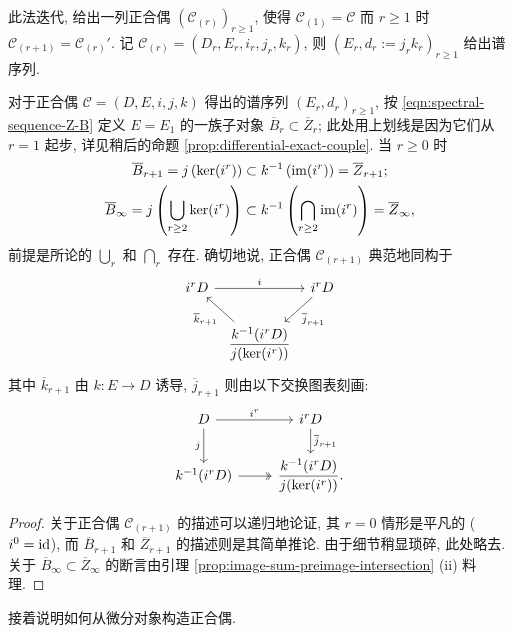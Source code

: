 此法迭代, 给出一列正合偶 $(\mathscr{C}_{(r)})_{r \geq 1}$, 使得 $\mathscr{C}_{(1)} = \mathscr{C}$ 而 $r \geq 1$ 时 $\mathscr{C}_{(r+1)} = \mathscr{C}_{(r)}'$. 记 $\mathscr{C}_{(r)} = (D_r, E_r, i_r, j_r, k_r)$, 则 $(E_r, d_r := j_r k_r)_{r \geq 1}$ 给出谱序列.

\begin{lemma}\label{prop:exact-couple-Z-B}
	对于正合偶 $\mathscr{C} = (D, E, i, j, k)$ 得出的谱序列 $(E_r, d_r)_{r \geq 1}$, 按 \eqref{eqn:spectral-sequence-Z-B} 定义 $E = E_1$ 的一族子对象 $\overline{B}_r \subset \overline{Z}_r$; 此处用上划线是因为它们从 $r=1$ 起步, 详见稍后的命题 \ref{prop:differential-exact-couple}. 当 $r \geq 0$ 时
	\begin{gather*}
		\overline{B}_{r+1} = j\left(\operatorname{ker}(i^r)\right) \subset k^{-1}\left( \operatorname{im}(i^r) \right) = \overline{Z}_{r+1}; \\
		\overline{B}_\infty = j\left( \bigcup_{r \geq 2} \operatorname{ker}(i^r) \right) \subset k^{-1}\left( \bigcap_{r \geq 2} \operatorname{im}(i^r) \right) = \overline{Z}_\infty ,
	\end{gather*}
	前提是所论的 $\bigcup_r$ 和 $\bigcap_r$ 存在. 确切地说, 正合偶 $\mathscr{C}_{(r+1)}$ 典范地同构于
	\[\begin{tikzcd}[column sep=tiny]
		i^r D \arrow[rr, "i"] & & i^r D \arrow[ld, "{\overline{j}_{r+1}}"] \\
		& \dfrac{k^{-1}(i^r D)}{j(\Ker(i^r))} \arrow[lu, "{\overline{k}_{r+1}}"] &
	\end{tikzcd}\]
	其中 $\overline{k}_{r+1}$ 由 $k: E \to D$ 诱导, $\overline{j}_{r+1}$ 则由以下交换图表刻画:
	\[\begin{tikzcd}
		D \arrow[r, "{i^r}"] \arrow[d, "j"'] & i^r D \arrow[d, "{\overline{j}_{r+1}}"] \\
		k^{-1}(i^r D) \arrow[twoheadrightarrow, r] & \dfrac{k^{-1}(i^r D)}{j(\Ker(i^r))}.
	\end{tikzcd}\]
\end{lemma}
\begin{proof}
	关于正合偶 $\mathscr{C}_{(r+1)}$ 的描述可以递归地论证, 其 $r=0$ 情形是平凡的 ($i^0 = \mathrm{id}$), 而 $\overline{B}_{r+1}$ 和 $\overline{Z}_{r+1}$ 的描述则是其简单推论. 由于细节稍显琐碎, 此处略去. 关于 $\overline{B}_\infty \subset \overline{Z}_\infty$ 的断言由引理 \ref{prop:image-sum-preimage-intersection} (ii) 料理.
\end{proof}

接着说明如何从微分对象构造正合偶.

